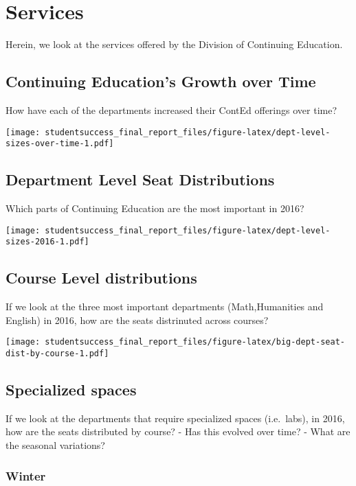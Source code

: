 \documentclass[]{book}
\theoremstyle{definition}
\theoremstyle{definition}
\theoremstyle{remark}
\begin{document}
\section{Services}\label{services}

Herein, we look at the services offered by the Division of Continuing
Education.

\subsection{Continuing Education's Growth over
Time}\label{continuing-educations-growth-over-time}

How have each of the departments increased their ContEd offerings over
time?

\texttt{[image: studentsuccess\_final\_report\_files/figure-latex/dept-level-sizes-over-time-1.pdf]}

\subsection{Department Level Seat
Distributions}\label{department-level-seat-distributions}

Which parts of Continuing Education are the most important in 2016?

\texttt{[image: studentsuccess\_final\_report\_files/figure-latex/dept-level-sizes-2016-1.pdf]}

\subsection{Course Level
distributions}\label{course-level-distributions}

If we look at the three most important departments (Math,Humanities and
English) in 2016, how are the seats distrinuted across courses?

\texttt{[image: studentsuccess\_final\_report\_files/figure-latex/big-dept-seat-dist-by-course-1.pdf]}

\subsection{Specialized spaces}\label{specialized-spaces}

If we look at the departments that require specialized spaces
(i.e.~labs), in 2016, how are the seats distributed by course? - Has
this evolved over time? - What are the seasonal variations?

\subsubsection{Winter}\label{winter}
\end{document}
